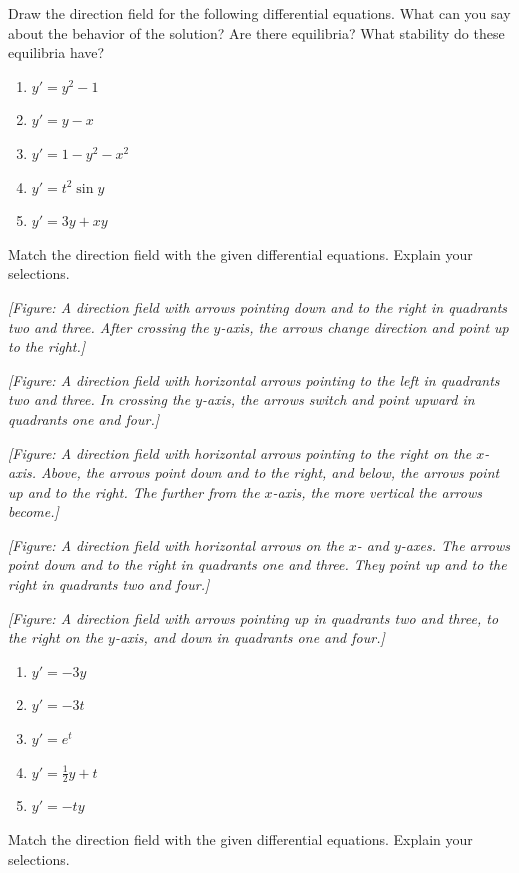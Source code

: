 \documentclass{exercises}
\begin{document}
Draw the direction field for the following differential equations. What can you say about the behavior of the solution? Are there equilibria? What stability do these equilibria have?

\begin{enumerate}[resume]
\item $y'=y^{2}-1$
\item $y'=y-x$
\item $y'=1-y^{2}-x^{2}$
\item $y'=t^{2}\sin y$
\item $y'=3y+xy$
\end{enumerate}

Match the direction field with the given differential equations. Explain your selections.


\textit{[Figure: A direction field with arrows pointing down and to the right in quadrants two and three. After crossing the $y$-axis, the arrows change direction and point up to the right.]}


\textit{[Figure: A direction field with horizontal arrows pointing to the left in quadrants two and three. In crossing the $y$-axis, the arrows switch and point upward in quadrants one and four.]}


\textit{[Figure: A direction field with horizontal arrows pointing to the right on the $x$-axis. Above, the arrows point down and to the right, and below, the arrows point up and to the right. The further from the $x$-axis, the more vertical the arrows become.]}


\textit{[Figure: A direction field with horizontal arrows on the $x$- and $y$-axes. The arrows point down and to the right in quadrants one and three. They point up and to the right in quadrants two and four.]}


\textit{[Figure: A direction field with arrows pointing up in quadrants two and three, to the right on the $y$-axis, and down in quadrants one and four.]}

\begin{enumerate}[resume]
\item $y'=-3y$
\item $y'=-3t$
\item $y'=e^{t}$
\item $y'=\frac{1}{2}y+t$
\item $y'=-ty$
\end{enumerate}

Match the direction field with the given differential equations. Explain your selections.
\end{document}
